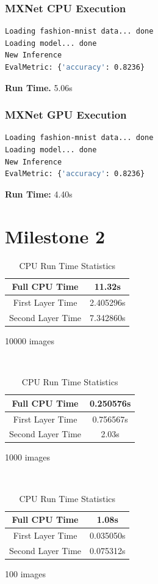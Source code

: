 \documentclass{article}
\begin{document}
\section{MXNet CPU Execution}
\begin{lstlisting}[language=bash]
Loading fashion-mnist data... done
Loading model... done
New Inference
EvalMetric: {'accuracy': 0.8236}
\end{lstlisting}

\textbf{Run Time.} 5.06s

\pagebreak
\section{MXNet GPU Execution}
\begin{lstlisting}[language=bash]
Loading fashion-mnist data... done
Loading model... done
New Inference
EvalMetric: {'accuracy': 0.8236}
\end{lstlisting}

\textbf{Run Time:} 4.40s

\part*{Milestone 2}
\setcounter{section}{0}

\begin{table}[H]
    \centering
    \begin{minipage}{.32\linewidth}
        \begin{tabular}{c|c}
            Full CPU Time & 11.32s \\ \hline
            First Layer Time & 2.405296s \\ \hline
            Second Layer Time & 7.342860s
        \end{tabular}
        \caption*{10000 images}
    \end{minipage}
    ~
    \begin{minipage}{.32\linewidth}
        \begin{tabular}{c|c}
            Full CPU Time & 0.250576s \\ \hline
            First Layer Time & 0.756567s \\ \hline
            Second Layer Time & 2.03s
        \end{tabular}
        \caption*{1000 images}
    \end{minipage}
    ~
    \begin{minipage}{.32\linewidth}
        \begin{tabular}{c|c}
            Full CPU Time & 1.08s \\ \hline
            First Layer Time & 0.035050s \\ \hline
            Second Layer Time & 0.075312s
        \end{tabular}
        \caption*{100 images}
    \end{minipage}
    \caption{CPU Run Time Statistics}
\end{table}
\end{document}
